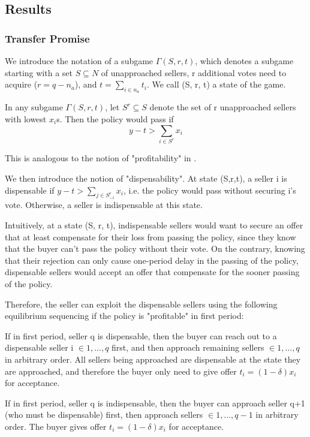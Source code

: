 \documentclass[ProjectGAZ]{subfiles}
\begin{document}
\subsection{Results}\label{subsec:CnZ-Results}
\subsubsection{Transfer Promise}
We introduce the notation of a subgame $\Gamma(S,r,t)$, which denotes a subgame starting with a set $S\subseteq N$ of unapproached sellers, r additional votes need to acquire ($r = q - n_a$), and $t = \sum_{i \in n_a} t_i$. We call (S, r, t) a state of the game.

In any subgame  $\Gamma(S,r,t)$, let $S^r \subseteq S$ denote the set of r unapproached sellers with lowest $x_i$s. Then the policy would pass if 
\begin{equation}
	y - t > \sum_{i \in S^r} x_i
\end{equation}

This is analogous to the notion of "profitability" in \cite{Xiao}.

We then introduce the notion of "dispensability". At state (S,r,t), a seller i is dispensable if $y-t > \sum_{j \in S_{-i}^r} x_i$, i.e. the policy would pass without securing i's vote. Otherwise, a seller is indispensable at this state.

Intuitively, at a state (S, r, t), indispensable sellers would want to secure an offer that at least compensate for their loss from passing the policy, since they know that the buyer can't pass the policy without their vote. On the contrary, knowing that their rejection can only cause one-period delay in the passing of the policy, dispensable sellers would accept an offer that compensate for the sooner passing of the policy.

Therefore, the seller can exploit the dispensable sellers using the following equilibrium sequencing if the policy is "profitable" in first period:

If in first period, seller q is dispensable, then the buyer can reach out to a dispensable seller i $\in{1, ..., q}$ first, and then approach remaining sellers $\in{1, ..., q}$ in arbitrary order. All sellers being approached are dispensable at the state they are approached, and therefore the buyer only need to give offer $t_i = (1-\delta)x_i$ for acceptance.

If in first period, seller q is indispensable, then the buyer can approach seller q+1 (who must be dispensable) first, then approach sellers $\in {1, ..., q-1}$ in arbitrary order. The buyer gives offer $t_i = (1-\delta)x_i$ for acceptance.
\end{document}
